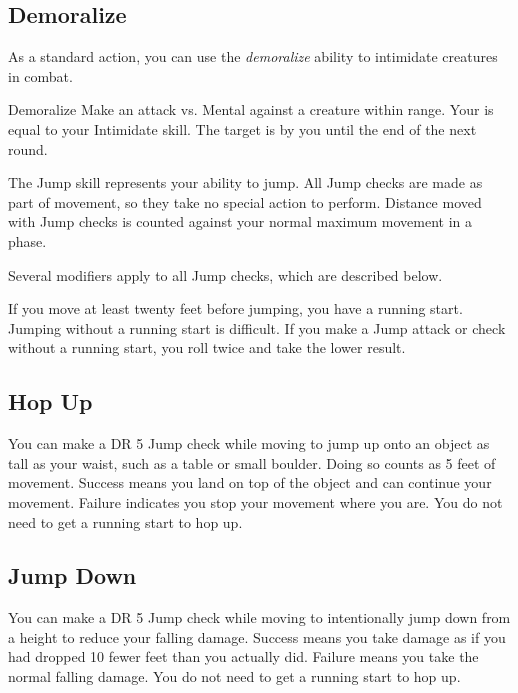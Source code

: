     \subsection{Demoralize}\label{Demoralize}

        As a standard action, you can use the \textit{demoralize} ability to intimidate creatures in combat.

        \begin{freeability}{Demoralize}
            Make an attack vs. Mental against a creature within \rngmed range.
            Your  is equal to your Intimidate skill.
            \hit The target is \shaken by you until the end of the next round.
        \end{freeability}

\newpage
{}
        The Jump skill represents your ability to jump. All Jump checks are made as part of movement, so they take no special action to perform. Distance moved with Jump checks is counted against your normal maximum movement in a phase.

        Several modifiers apply to all Jump checks, which are described below.

        \label{Running Start} If you move at least twenty feet before jumping, you have a running start.
        Jumping without a running start is difficult.
        If you make a Jump attack or check without a running start, you roll twice and take the lower result.

    \subsection{Hop Up}
        You can make a DR 5 Jump check while moving to jump up onto an object as tall as your waist, such as a table or small boulder. Doing so counts as 5 feet of movement. Success means you land on top of the object and can continue your movement. Failure indicates you stop your movement where you are. You do not need to get a running start to hop up.

    \subsection{Jump Down}
        You can make a DR 5 Jump check while moving to intentionally jump down from a height to reduce your falling damage. Success means you take damage as if you had dropped 10 fewer feet than you actually did. Failure means you take the normal falling damage. You do not need to get a running start to hop up.

